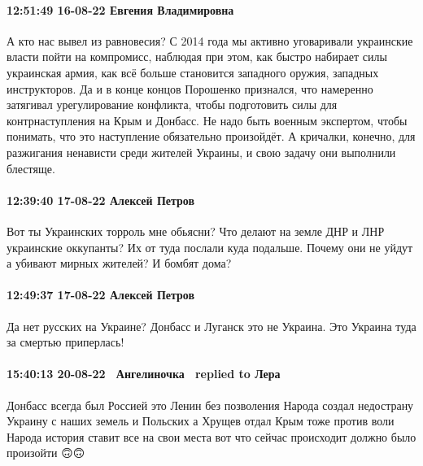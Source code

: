  
 
 
 
 

\paragraph{12:51:49 16-08-22 Евгения Владимировна}

А кто нас вывел из равновесия? С 2014 года мы активно уговаривали украинские
власти пойти на компромисс, наблюдая при этом, как быстро набирает силы
украинская армия, как всё больше становится западного оружия, западных
инструкторов. Да и в конце концов Порошенко признался, что намеренно затягивал
урегулирование конфликта, чтобы подготовить силы для контрнаступления на Крым и
Донбасс. Не надо быть военным экспертом, чтобы понимать, что это наступление
обязательно произойдёт. А кричалки, конечно, для разжигания ненависти среди
жителей Украины, и свою задачу они выполнили блестяще.

\paragraph{12:39:40 17-08-22 Алексей Петров}

Вот ты Украинских торроль мне обьясни? Что делают на земле ДНР и ЛНР украинские
оккупанты? Их от туда послали куда подальше. Почему они не уйдут а убивают
мирных жителей? И бомбят дома?

\paragraph{12:49:37 17-08-22 Алексей Петров}

Да нет русских на Украине? Донбасс и Луганск это не Украина. Это Украина туда
за смертью приперлась!

\paragraph{15:40:13 20-08-22 🧚‍♀️Ангелиночка 🧚‍♀️replied to Лера}

Донбасс всегда был Россией это Ленин без позволения Народа создал недострану
Украину с наших земель и Польских а Хрущев отдал Крым тоже против воли Народа
история ставит все на свои места вот что сейчас происходит должно было
произойти 🙃🙃


